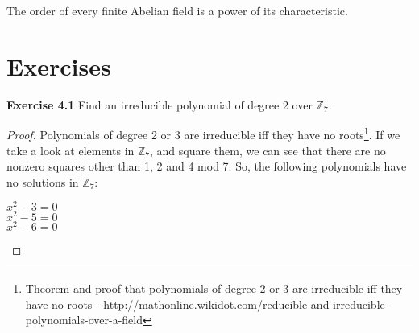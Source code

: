 \documentclass[a4paper]{article}
\begin{document}
\begin{theorem}
The order of every finite Abelian field is a power of its characteristic.
\end{theorem}



\section{Exercises}
\noindent \textbf{Exercise 4.1} Find an irreducible polynomial of degree 2 over $\mathbb{Z}_{7}$.
\begin{proof}
Polynomials of degree 2 or 3 are irreducible iff they have no roots\footnote{Theorem and proof that polynomials of degree 2 or 3 are irreducible iff they have no roots - http://mathonline.wikidot.com/reducible-and-irreducible-polynomials-over-a-field}. If we take a look at elements in $\mathbb{Z}_{7}$, and square them, we can see that there are no nonzero squares other than 1, 2 and 4 mod 7. So, the following polynomials have no solutions in $\mathbb{Z}_{7}$:
\begin{center}
$x^2 - 3 = 0$\\
$x^2 - 5 = 0$\\
$x^2 - 6 = 0$	
\end{center}
\end{proof}
\end{document}

